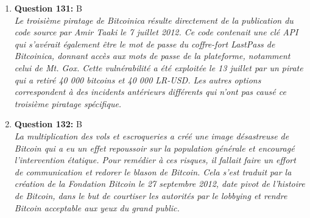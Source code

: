 \documentclass[12pt,a4paper]{article}
\begin{document}
\begin{enumerate}
\item \textbf{Question 131:} B
\\ \textit{Le troisième piratage de Bitcoinica résulte directement de la publication du code source par Amir Taaki le 7 juillet 2012. Ce code contenait une clé API qui s'avérait également être le mot de passe du coffre-fort LastPass de Bitcoinica, donnant accès aux mots de passe de la plateforme, notamment celui de Mt. Gox. Cette vulnérabilité a été exploitée le 13 juillet par un pirate qui a retiré 40 000 bitcoins et 40 000 LR-USD. Les autres options correspondent à des incidents antérieurs différents qui n'ont pas causé ce troisième piratage spécifique.}

\item \textbf{Question 132:} B
\\ \textit{La multiplication des vols et escroqueries a créé une image désastreuse de Bitcoin qui a eu un effet repoussoir sur la population générale et encouragé l'intervention étatique. Pour remédier à ces risques, il fallait faire un effort de communication et redorer le blason de Bitcoin. Cela s'est traduit par la création de la Fondation Bitcoin le 27 septembre 2012, date pivot de l'histoire de Bitcoin, dans le but de courtiser les autorités par le lobbying et rendre Bitcoin acceptable aux yeux du grand public.}


\end{enumerate}
\end{document}
